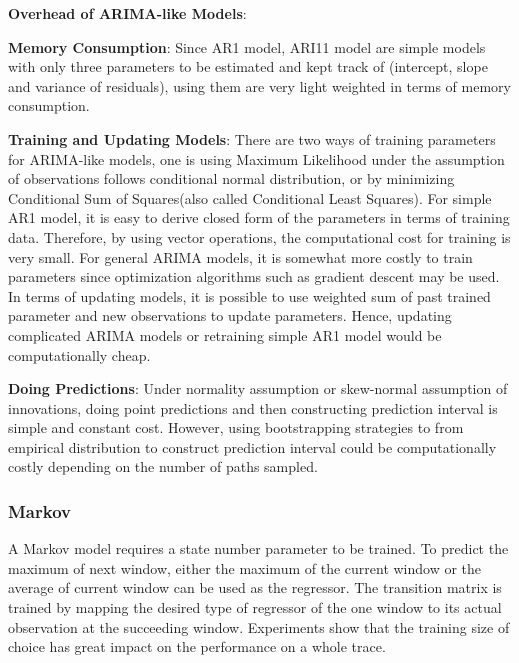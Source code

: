 \documentclass{article}
\begin{document}
\begin{flushleft}
\textbf{Overhead of ARIMA-like Models}:

\textbf{Memory Consumption}: Since AR1 model, ARI11 model are simple models with only three parameters to be estimated and kept track of (intercept, slope and variance of residuals), using them are very light weighted in terms of memory consumption. 

\textbf{Training and Updating Models}: There are two ways of training parameters for ARIMA-like models, one is using Maximum Likelihood under the assumption of observations follows conditional normal distribution, or by minimizing Conditional Sum of Squares(also called Conditional Least Squares). For simple AR1 model, it is easy to derive closed form of the parameters in terms of training data. Therefore, by using vector operations, the computational cost for training is very small. For general ARIMA models, it is somewhat more costly to train parameters since optimization algorithms such as gradient descent may be used. In terms of updating models, it is possible to use weighted sum of past trained parameter and new observations to update parameters. Hence, updating complicated ARIMA models or retraining simple AR1 model would be computationally cheap.

\textbf{Doing Predictions}: Under normality assumption or skew-normal assumption of innovations, doing point predictions and then constructing prediction interval is simple and constant cost. However, using bootstrapping strategies to from empirical distribution to construct prediction interval could be computationally costly depending on the number of paths sampled. 
\end{flushleft}

\subsubsection{Markov}

\begin{flushleft}
A Markov model requires a state number parameter to be trained. To predict the maximum of next window, either the maximum of the current window or the average of current window can be used as the regressor. The transition matrix is trained by mapping the desired type of regressor of the one window to its actual observation at the succeeding window. Experiments show that the training size of choice has great impact on the performance on a whole trace.
\end{flushleft}
\end{document}
